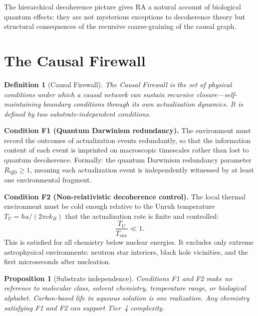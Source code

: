 \documentclass[11pt]{article}
\newtheorem{definition}{Definition}
\newtheorem{proposition}{Proposition}
\begin{document}
The hierarchical decoherence picture gives RA a natural account of biological quantum effects: they are not mysterious exceptions to decoherence theory but structural consequences of the recursive coarse-graining of the causal graph.

\section{The Causal Firewall}
\label{sec:firewall}

\begin{definition}[Causal Firewall]
The Causal Firewall is the set of physical conditions under which a causal network can sustain recursive closure---self-maintaining boundary conditions through its own actualization dynamics. It is defined by two substrate-independent conditions.
\end{definition}

\textbf{Condition F1 (Quantum Darwinism redundancy).} The environment must record the outcomes of actualization events redundantly, so that the information content of each event is imprinted on macroscopic timescales rather than lost to quantum decoherence. Formally: the quantum Darwinism redundancy parameter $R_{\mathrm{QD}}\ge 1$, meaning each actualization event is independently witnessed by at least one environmental fragment.

\textbf{Condition F2 (Non-relativistic decoherence control).} The local thermal environment must be cold enough relative to the Unruh temperature $T_U=\hbar a/(2\pi c k_B)$ that the actualization rate is finite and controlled:
\begin{equation}
\frac{T_U}{T_{\mathrm{env}}} \ll 1.
\label{eq:f2}
\end{equation}
This is satisfied for all chemistry below nuclear energies. It excludes only extreme astrophysical environments: neutron star interiors, black hole vicinities, and the first microseconds after nucleation.

\begin{proposition}[Substrate independence]
Conditions F1 and F2 make no reference to molecular class, solvent chemistry, temperature range, or biological alphabet. Carbon-based life in aqueous solution is one realization. Any chemistry satisfying F1 and F2 can support Tier~4 complexity.
\end{proposition}
\end{document}
